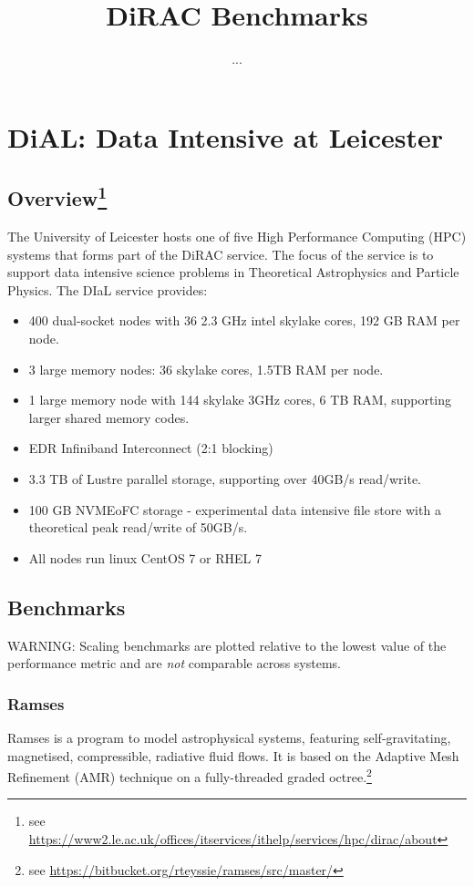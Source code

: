 \documentclass[10pt]{article}
\title{DiRAC Benchmarks}
\author{...}
\begin{document}
\maketitle

\section{DiAL: Data Intensive at Leicester}

\subsection{Overview{\footnote{see \url{https://www2.le.ac.uk/offices/itservices/ithelp/services/hpc/dirac/about}}}
}

The University of Leicester hosts one of five High Performance Computing (HPC) systems that forms
part of the DiRAC service. The focus of the service is to support data intensive science problems
in Theoretical Astrophysics and Particle Physics. The DIaL service provides:

\begin{itemize}
	\item 400 dual-socket nodes with 36 2.3 GHz intel skylake cores, 192 GB RAM per node.
	\item 3 large memory nodes: 36 skylake cores, 1.5TB RAM per node.
	\item 1 large memory node with 144 skylake 3GHz cores, 6 TB RAM, supporting larger shared memory codes.
	\item EDR Infiniband Interconnect (2:1 blocking)
	\item 3.3 TB of Lustre parallel storage, supporting over 40GB/s read/write.
	\item 100 GB NVMEoFC storage - experimental data intensive file store with a theoretical peak read/write of 50GB/s.
	\item All nodes run linux CentOS 7 or RHEL 7
\end{itemize}

\clearpage
\subsection{Benchmarks}

{\color{orange} WARNING:} Scaling benchmarks are plotted relative to the lowest value of the
performance metric and are \emph{not} comparable across systems.

\subsubsection{Ramses}
Ramses is a program to model astrophysical systems, featuring
self-gravitating, magnetised, compressible, radiative fluid flows. It is based
on the Adaptive Mesh Refinement (AMR) technique on a fully-threaded graded octree.\footnote{see \url{https://bitbucket.org/rteyssie/ramses/src/master/}}
\end{document}
